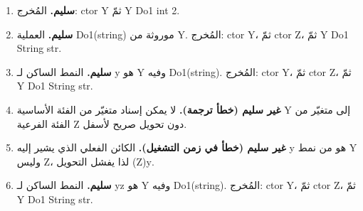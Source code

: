 \def\bagrutTocEntry{\phantomsection\addcontentsline{toc}{subsection}{\texorpdfstring{سؤال $10$ امتحان $\mathrm{899271B}$ سنة $2025$}{سؤال 10 امتحان 899271B سنة 2025}}\global\let\bagrutTocEntry\relax}%



\ifwithsols
\begin{boxSolution}
\begin{enumerate}[label=\textbf{\arabic*.}, itemsep=0.35em]
    \item \textbf{سليم.} المُخرج: \textenglish{ctor Y} ثمّ \textenglish{Y Do1 int 2}.
    \item \textbf{سليم.} العملية \textenglish{Do1(string)} موروثة من \textenglish{Y}. المُخرج: \textenglish{ctor Y}، ثمّ \textenglish{ctor Z}، ثمّ \textenglish{Y Do1 String str}.
    \item \textbf{سليم.} النمط الساكن لـ \textenglish{y} هو \textenglish{Y} وفيه \textenglish{Do1(string)}. المُخرج: \textenglish{ctor Y}، ثمّ \textenglish{ctor Z}، ثمّ \textenglish{Y Do1 String str}.
    \item \textbf{غير سليم (خطأ ترجمة).} لا يمكن إسناد متغيّر من الفئة الأساسية \textenglish{Y} إلى متغيّر من الفئة الفرعية \textenglish{Z} دون تحويل صريح لأسفل.
    \item \textbf{غير سليم (خطأ في زمن التشغيل).} الكائن الفعلي الذي يشير إليه \textenglish{y} هو من نمط \textenglish{Y} وليس \textenglish{Z}، لذا يفشل التحويل \textenglish{(Z)y}.
    \item \textbf{سليم.} النمط الساكن لـ \textenglish{yz} هو \textenglish{Y} وفيه \textenglish{Do1(string)}. المُخرج: \textenglish{ctor Y}، ثمّ \textenglish{ctor Z}، ثمّ \textenglish{Y Do1 String str}.
\end{enumerate}
\end{boxSolution}

\filbreak

